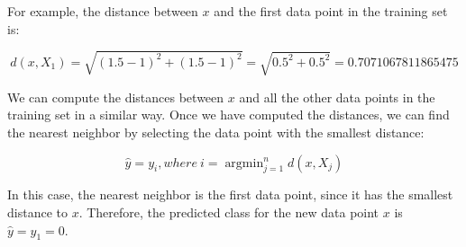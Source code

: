 \documentclass{article}
\theoremstyle{mytheoremstyle}
\theoremstyle{mytheoremstyle}
\theoremstyle{myproblemstyle}
\begin{document}
For example, the distance between $x$ and the first data point in the training set is:

$$d(x, X_1) = \sqrt{(1.5 - 1)^2 + (1.5 - 1)^2} = \sqrt{0.5^2 + 0.5^2} = 0.7071067811865475$$

We can compute the distances between $x$ and all the other data points in the training set in a similar way. Once we have computed the distances, we can find the nearest neighbor by selecting the data point with the smallest distance:

$$\hat{y} = y_i, where\ i = \operatorname{argmin}_{j=1}^n d(x, X_j)$$

In this case, the nearest neighbor is the first data point, since it has the smallest distance to $x$. Therefore, the predicted class for the new data point $x$ is $\hat{y} = y_1 = 0$.


\end{document}
